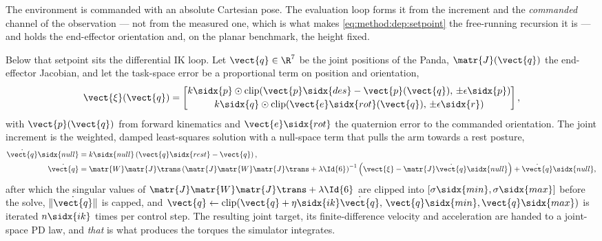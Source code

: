The environment is commanded with an absolute Cartesian pose. The evaluation loop forms it from the
increment and the \emph{commanded} channel of the observation --- not from the measured one, which
is what makes \eqref{eq:method:dep:setpoint} the free-running recursion it is --- and holds the
end-effector orientation and, on the planar benchmark, the height fixed.

Below that setpoint sits the differential \ac{IK} loop. Let $\vect{q}\in\R^{7}$ be the joint
positions of the Panda, $\matr{J}(\vect{q})$ the end-effector Jacobian, and let the task-space error be a
proportional term on position and orientation,
\begin{equation}\label{eq:method:dep:taskerr}
  \vect{\xi}(\vect{q})
  = \begin{bmatrix}
      k\sidx{p}\odot\operatorname{clip}\!\left(\vect{p}\sidx{des}-\vect{p}(\vect{q}),\,\pm\epsilon\sidx{p}\right)\\[2pt]
      k\sidx{q}\odot\operatorname{clip}\!\left(\vect{e}\sidx{rot}(\vect{q}),\,\pm\epsilon\sidx{r}\right)
    \end{bmatrix},
\end{equation}
with $\vect{p}(\vect{q})$ from forward kinematics and $\vect{e}\sidx{rot}$ the quaternion error to the
commanded orientation. The joint increment is the weighted, damped least-squares solution with a
null-space term that pulls the arm towards a rest posture,
\begin{align}
  \dot{\vect{q}}\sidx{null} &= k\sidx{null}\left(\vect{q}\sidx{rest}-\vect{q}\right),
    \label{eq:method:dep:null}\\
  \dot{\vect{q}}
    &= \matr{W}\matr{J}\trans
       \left(\matr{J}\matr{W}\matr{J}\trans + \lambda\Id{6}\right)^{-1}
       \left(\vect{\xi} - \matr{J}\dot{\vect{q}}\sidx{null}\right)
     + \dot{\vect{q}}\sidx{null},
    \label{eq:method:dep:dls}
\end{align}
after which the singular values of $\matr{J}\matr{W}\matr{J}\trans + \lambda\Id{6}$ are clipped into
$[\sigma\sidx{min},\sigma\sidx{max}]$ before the solve, $\|\dot{\vect{q}}\|$ is capped, and
$\vect{q} \leftarrow \operatorname{clip}(\vect{q}+\eta\sidx{ik}\dot{\vect{q}},\,\vect{q}\sidx{min},\vect{q}\sidx{max})$
is iterated $n\sidx{ik}$ times per control step. The resulting joint target, its finite-difference
velocity and acceleration are handed to a joint-space PD law, and \emph{that} is what produces the
torques the simulator integrates.

